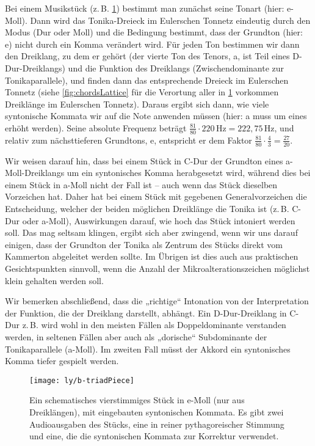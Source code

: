 Bei einem Musikstück (z.\,B. \cref{fig:triadPiece}) bestimmt man zunächst seine
Tonart (hier: e-Moll). Dann wird das Tonika-Dreieck im Eulerschen Tonnetz
eindeutig durch den Modus (Dur oder Moll) und die Bedingung bestimmt, dass der
Grundton (hier: e) nicht durch ein Komma verändert wird. Für jeden Ton bestimmen
wir dann den Dreiklang, zu dem er gehört (der vierte Ton des Tenors, a, ist Teil
eines D-Dur-Dreiklangs) und die Funktion des Dreiklangs (Zwischendominante zur
Tonikaparallele), und finden dann das entsprechende Dreieck im Eulerschen
Tonnetz (siehe \cref{fig:chordsLattice} für die Verortung aller in
\cref{fig:triadPiece} vorkommen Dreiklänge im Eulerschen Tonnetz). Daraus ergibt
sich dann, wie viele syntonische Kommata wir auf die Note anwenden müssen (hier:
a muss um eines erhöht werden). Seine absolute Frequenz beträgt
$\frac{81}{80}\cdot 220\,\text{Hz}=222{,}75\,\text{Hz}$, und relativ zum
nächsttieferen Grundtons, e, entspricht er dem Faktor
$\frac{81}{80}\cdot\frac{4}{3}=\frac{27}{20}$.

Wir weisen darauf hin, dass bei einem Stück in C-Dur der Grundton eines
a-Moll-Dreiklangs um ein syntonisches Komma herabgesetzt wird, während dies bei
einem Stück in a-Moll nicht der Fall ist – auch wenn das Stück dieselben
Vorzeichen hat. Daher hat bei einem Stück mit gegebenen Generalvorzeichen die
Entscheidung, welcher der beiden möglichen Dreiklänge die Tonika ist
(z.\,B. C-Dur oder a-Moll), Auswirkungen darauf, wie hoch das Stück intoniert
werden soll. Das mag seltsam klingen, ergibt sich aber zwingend, wenn wir uns
darauf einigen, dass der Grundton der Tonika als Zentrum des Stücks direkt vom
Kammerton abgeleitet werden sollte. Im Übrigen ist dies auch aus praktischen
Gesichtspunkten sinnvoll, wenn die Anzahl der Mikroalterationszeichen möglichst
klein gehalten werden soll.

\wrap{\enlargethispage{\baselineskip}}

Wir bemerken abschließend, dass die „richtige“ Intonation von der Interpretation der
Funktion, die der Dreiklang darstellt, abhängt. Ein D-Dur-Dreiklang in C-Dur
z.\,B.  wird wohl in den meisten Fällen als Doppeldominante verstanden werden,
in seltenen Fällen aber auch als „dorische“ Subdominante der Tonikaparallele
(a-Moll). Im zweiten Fall müsst der Akkord ein syntonisches Komma tiefer
gespielt werden.

\begin{figure}
  \centering
  \texttt{[image: ly/b-triadPiece]}
  \caption{Ein schematisches vierstimmiges Stück in e-Moll (nur aus
  	Dreiklängen), mit eingebauten syntonischen Kommata. Es gibt zwei
  	Audioausgaben des Stücks, eine in reiner pythagoreischer Stimmung und eine,
  	die die syntonischen Kommata zur Korrektur
  	verwendet.}\label{fig:triadPiece}
\end{figure}

